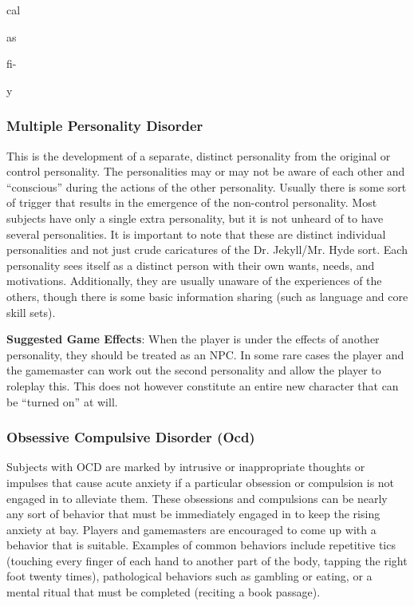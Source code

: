 cal

as

fi-

y

\subsubsection{Multiple Personality Disorder}

This is the development of a separate, distinct personality
from the original or control personality.
The personalities may or may not be aware of each 
other and ``conscious'' during the actions of the other 
personality. Usually there is some sort of trigger that 
results in the emergence of the non-control personality. 
Most subjects have only a single extra personality, but 
it is not unheard of to have several personalities. It 
is important to note that these are distinct individual 
personalities and not just crude caricatures of the Dr. 
Jekyll/Mr. Hyde sort. Each personality sees itself as 
a distinct person with their own wants, needs, and 
motivations. Additionally, they are usually unaware 
of the experiences of the others, though there is some 
basic information sharing (such as language and core 
skill sets).

\textbf{Suggested Game Effects}: When the player is under 
the effects of another personality, they should be 
treated as an NPC. In some rare cases the player and 
the gamemaster can work out the second personality 
and allow the player to roleplay this. This does not 
however constitute an entire new character that can 
be ``turned on'' at will.

\subsubsection{Obsessive Compulsive Disorder (Ocd)}

Subjects with OCD are marked by intrusive or inappropriate
thoughts or impulses that cause acute
anxiety if a particular obsession or compulsion is not 
engaged in to alleviate them. These obsessions and 
compulsions can be nearly any sort of behavior that 
must be immediately engaged in to keep the rising 
anxiety at bay. Players and gamemasters are encouraged
to come up with a behavior that is suitable.
Examples of common behaviors include repetitive 
tics (touching every finger of each hand to another 
part of the body, tapping the right foot twenty times), 
pathological behaviors such as gambling or eating, 
or a mental ritual that must be completed (reciting a 
book passage).

